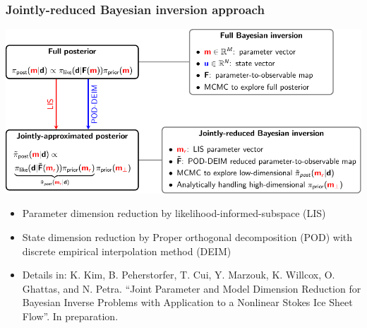 \documentclass{beamer}
\begin{document}
\begin{frame}
  \frametitle{Jointly-reduced Bayesian inversion approach}
  \begin{center}
    \includegraphics[width=\columnwidth]{tikz/summary_reduced_bayes.pdf}
  \end{center}

  \begin{itemize}
    \item Parameter dimension reduction by likelihood-informed-subspace (LIS)
    \item State dimension reduction by Proper orthogonal decomposition (POD) with
      discrete empirical interpolation method (DEIM)
  \end{itemize}

  \vspace{0.3cm}

  \tiny
  \begin{itemize}
    \item [] Details in: K. Kim, B. Peherstorfer, T. Cui, Y. Marzouk, K.
      Willcox, O. Ghattas, and N. Petra. “Joint Parameter and Model Dimension
      Reduction for Bayesian Inverse Problems with Application to a Nonlinear
      Stokes Ice Sheet Flow”. In preparation.
  \end{itemize}
\end{frame}
\end{document}
